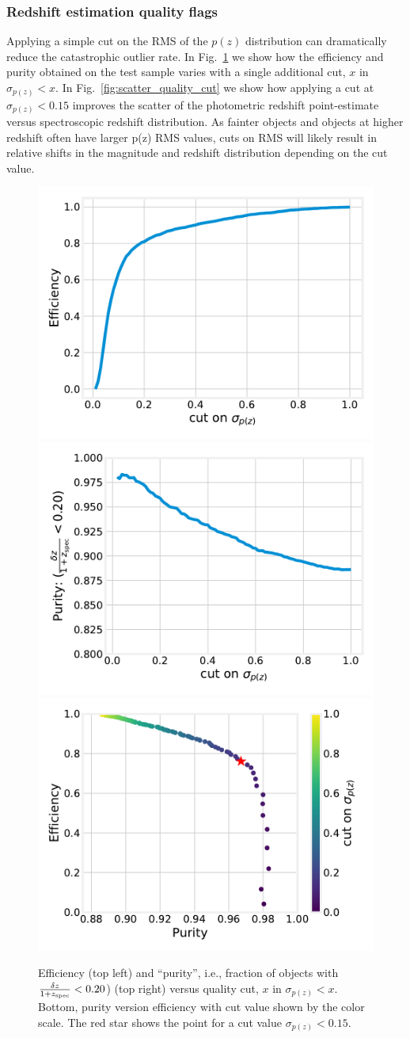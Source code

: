 \subsubsection{Redshift estimation quality flags}
\label{sec:performance:pz:flag}

Applying a simple cut on the RMS of the $p(z)$ distribution can dramatically reduce the catastrophic outlier rate.  In Fig.~\ref{fig:perf_quality_cut} we show how the efficiency and purity obtained on the test sample varies with a single additional cut, $x$ in $\sigma_{p(z)} < x$.   In Fig.~\ref{fig:scatter_quality_cut} we show how applying a cut at $\sigma_{p(z)} < 0.15$ improves the scatter of the photometric redshift point-estimate versus spectroscopic redshift distribution.  As fainter objects and objects at higher redshift often have larger p(z) RMS values, cuts on RMS will likely result in relative shifts in the magnitude and redshift distribution depending on the cut value.

\begin{figure}
    \centering
    \includegraphics[width=0.45\linewidth]{figures/efficiency.pdf}
    \includegraphics[width=0.45\linewidth]{figures/purity.pdf} \\
    \includegraphics[width=0.45\linewidth]{figures/purity_v_effic.pdf} \\
    \caption{Efficiency (top left) and ``purity'', i.e., fraction of objects with $\frac{\delta z}{1 + z_{\rm spec}} < 0.20$) (top right) versus quality cut, $x$ in $\sigma_{p(z)} < x$.   Bottom, purity version efficiency with cut value shown by the color scale.   The red star shows the point for a cut value  $\sigma_{p(z)} < 0.15$.}
    \label{fig:perf_quality_cut}
\end{figure}

